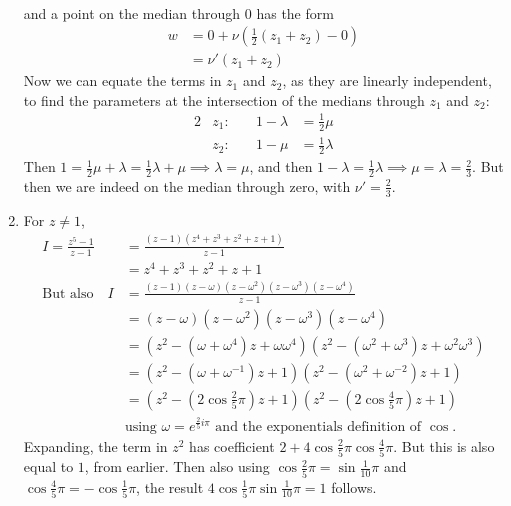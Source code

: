 \documentclass[fleqn,a4paper,11pt]{article}
\begin{document}
\begin{enumerate}
\begin{align*}
    \end{align*}
    and a point on the median through 0 has the form
    \begin{align*}
     w &= 0 + \nu (\tfrac 12 (z_1 + z_2) - 0) \\
       &= \nu' (z_1 + z_2)
    \end{align*}
    Now we can equate the terms in \(z_1\) and \(z_2\), as they are linearly
    independent, to find the parameters at the intersection of the medians
    through \(z_1\) and \(z_2\):
    \begin{alignat*}2
     &z_1\colon\quad& 1 - \lambda &= \tfrac 12 \mu \\
     &z_2\colon\quad& 1 - \mu &= \tfrac 12 \lambda
    \end{alignat*}
    Then
    \(1 = \frac 12 \mu + \lambda = \frac 12 \lambda + \mu \implies
      \lambda = \mu\), and then
    \(1 - \lambda = \frac 12 \lambda \implies
      \mu = \lambda = \frac 23\). But then we are indeed on the median through
    zero, with \(\nu' = \frac 23\).
   \item For \(z \ne 1\),
    \begin{align*}
     I = \frac{z^5 - 1}{z - 1}
       &= \frac{(z - 1)(z^4 + z^3 + z^2 + z + 1)}{z - 1} \\
       &= z^4 + z^3 + z^2 + z + 1 \\
     \text{But also}\quad
     I &= \frac{(z - 1)(z - \omega)
                (z - \omega^2)(z - \omega^3)(z - \omega^4)}{z - 1} \\
       &= (z - \omega)(z - \omega^2)(z - \omega^3)(z - \omega^4) \\
       &= (z^2 - (\omega + \omega^4)z + \omega \omega^4)
          (z^2 - (\omega^2 + \omega^3)z + \omega^2\omega^3) \\
       &= (z^2 - (\omega + \omega^{-1})z + 1)
          (z^2 - (\omega^2 + \omega^{-2})z + 1) \\
       &= (z^2 - (2 \cos \tfrac 25 \pi)z + 1)
          (z^2 - (2 \cos \tfrac 45 \pi)z + 1) \\
       &\text{using \(\omega = e^{\frac 25 i\pi}\) and the exponentials
              definition of \(\cos\).}
    \end{align*}
    Expanding, the term in \(z^2\) has coefficient
    \(2 + 4\cos \frac 25 \pi \cos \frac 45 \pi\). But this is also equal to
    \(1\), from earlier. Then also using
    \(\cos \frac 25 \pi = \sin \frac 1{10} \pi\) and
    \(\cos \frac 45 \pi = - \cos \frac 15 \pi\), the result
    \(4 \cos \frac 15 \pi \sin \frac 1{10} \pi = 1\) follows.

\end{enumerate}
\end{document}
